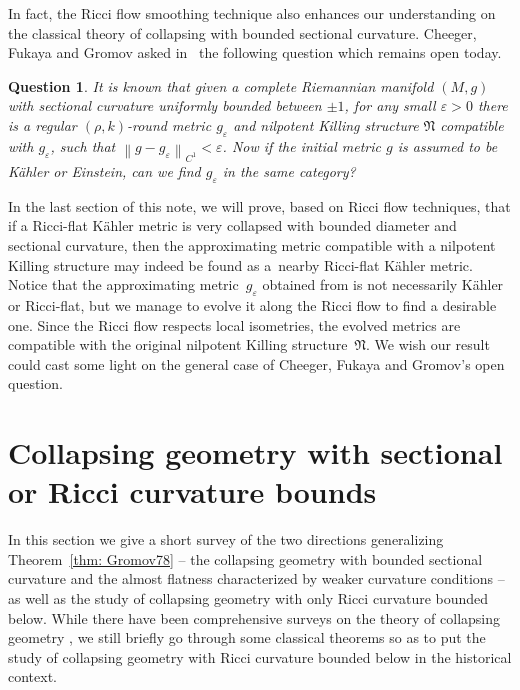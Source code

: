 \documentclass[pdftex]{sigma}
\numberwithin{equation}{section}
\newtheorem{Question}[Theorem]{Question}
\begin{document}
In fact, the Ricci flow smoothing technique also enhances our understanding on
the classical theory of collapsing with bounded sectional curvature. Cheeger,
Fukaya and Gromov asked in~\cite{CFG92} the following question which remains
open today.
\begin{Question}\label{qst: question}
It is known that given a complete Riemannian manifold $(M,g)$ with
sectional curvature uniformly bounded between $\pm 1$, for any small
$\varepsilon>0$ there is a regular $(\rho, k)$-round metric $g_{\varepsilon}$
and nilpotent Killing structure $\mathfrak{N}$ compatible with
$g_{\varepsilon}$, such that $\left\|g-g_{\varepsilon}\right\|_{C^1}<
\varepsilon$. Now if the initial metric $g$ is assumed to be K\"ahler or
Einstein, can we find $g_{\varepsilon}$ in the same category?
\end{Question}
In the last section of this note, we will prove, based on Ricci flow techniques,
that if a Ricci-flat K\"ahler metric is very collapsed with bounded diameter and
sectional curvature, then the approximating metric compatible with a nilpotent
Killing structure may indeed be found as a~nearby Ricci-flat K\"ahler metric.
Notice that the approximating metric~$g_{\varepsilon}$ obtained from
\cite[Theorem~1.7]{CFG92} is not necessarily K\"ahler or Ricci-flat, but we
manage to evolve it along the Ricci flow to find a desirable one. Since the
Ricci flow respects local isometries, the evolved metrics are compatible with the
original nilpotent Killing structure~$\mathfrak{N}$. We wish our result could
cast some light on the general case of Cheeger, Fukaya and Gromov's open
question.

\section{Collapsing geometry with sectional or Ricci curvature bounds}\label{section2}
In this section we give a short survey of the two directions generalizing
 Theorem~\ref{thm: Gromov78} -- the collapsing geometry with bounded
sectional curvature and the almost flatness characterized by weaker curvature
conditions -- as well as the study of collapsing geometry with only Ricci
curvature bounded below. While there have been comprehensive surveys on
the theory of collapsing geometry \cite{Fukaya06, Rong07}, we still
briefly go through some classical theorems so as to put the study of collapsing
geometry with Ricci curvature bounded below in the historical context.
\end{document}
